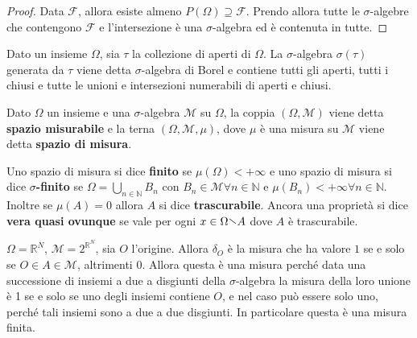 \begin{proof}
    Data \(\mathcal{F}\), allora esiste almeno \(P(\Omega) \supseteq \mathcal{F}
    \). Prendo allora tutte le \(\sigma\)-algebre che contengono \(\mathcal{F}\)
    e l'intersezione è una \(\sigma\)-algebra ed è contenuta in tutte.
\end{proof}

\begin{example}
    Dato un insieme \(\Omega\), sia \(\tau\) la collezione di aperti di
    \(\Omega\). La \(\sigma\)-algebra \(\sigma(\tau)\) generata da \(\tau\)
    viene detta \(\sigma\)-algebra di Borel e contiene tutti gli aperti, tutti i
    chiusi e tutte le unioni e intersezioni numerabili di aperti e chiusi.
\end{example}

\begin{definition}
\label{def:def_misura}
    Dato \(\Omega\) un insieme e una \(\sigma\)-algebra \(\mathcal{M}\) su
    \(\Omega\), la coppia \((\Omega, \mathcal{M})\) viene detta \textbf{spazio
    misurabile} e la terna \((\Omega, \mathcal{M}, \mu)\), dove \(\mu\) è una
    misura su \(\mathcal{M}\) viene detta \textbf{spazio di misura}.

    Uno spazio di misura si dice \textbf{finito} se \(\mu(\Omega) < +\infty\) e
    uno spazio di misura si dice \textbf{\(\sigma\)-finito} se \(\Omega =
    \bigcup_{n \in \mathbb{N}} B_{n} \) con \(B_{n} \in \mathcal{M} \forall n
    \in \mathbb{N}\) e \(\mu(B_{n}) < +\infty \forall n \in \mathbb{N}\).
    Inoltre se \(\mu(A) = 0\) allora \(A\) si dice \textbf{trascurabile}. Ancora
    una proprietà si dice \textbf{vera quasi ovunque} se vale per ogni \(x \in
    \Omega \sminus A\) dove \(A\) è trascurabile.
\end{definition}

\begin{example}
    \(\Omega = \mathbb{R}^{N}\), \(\mathcal{M} = 2^{\mathbb{R}^{N}}\), sia
        \(O\) l'origine. Allora \(\delta_O\) è la misura che ha valore \(1\) se
        e solo se \(O \in A \in \mathcal{M}\), altrimenti 0. Allora questa è una
        misura perché data una successione di insiemi a due a disgiunti della
        \(\sigma\)-algebra la misura della loro unione è 1 se e solo se uno
        degli insiemi contiene \(O\), e nel caso può essere solo uno, perché
        tali insiemi sono a due a due disgiunti. In particolare questa è una
        misura finita.
\end{example}

